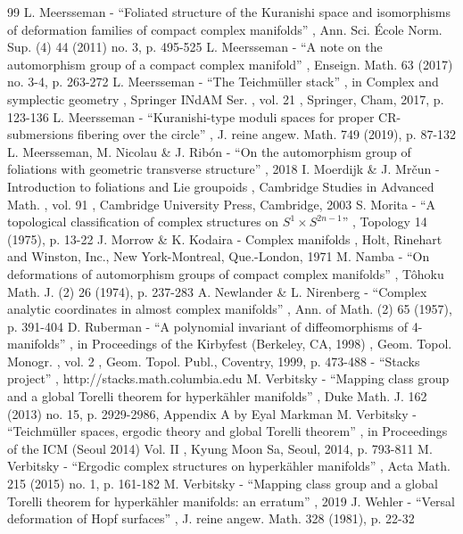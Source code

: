 \begin{thebibliography}{99}
 L. Meersseman - “Foliated structure of the Kuranishi space and isomorphisms of deformation families of compact complex manifolds” , Ann. Sci. École Norm. Sup. (4) 44 (2011) no. 3, p. 495-525
 L. Meersseman - “A note on the automorphism group of a compact complex manifold” , Enseign. Math. 63 (2017) no. 3-4, p. 263-272
 L. Meersseman - “The Teichmüller stack” , in Complex and symplectic geometry , Springer INdAM Ser. , vol. 21 , Springer, Cham, 2017, p. 123-136
 L. Meersseman - “Kuranishi-type moduli spaces for proper CR-submersions fibering over the circle” , J. reine angew. Math. 749 (2019), p. 87-132
 L. Meersseman, M. Nicolau \& J. Ribón - “On the automorphism group of foliations with geometric transverse structure” , 2018
 I. Moerdijk \& J. Mrčun - Introduction to foliations and Lie groupoids , Cambridge Studies in Advanced Math. , vol. 91 , Cambridge University Press, Cambridge, 2003
 S. Morita - “A topological classification of complex structures on $S^{1}\times S^{2n-1}$” , Topology 14 (1975), p. 13-22
 J. Morrow \& K. Kodaira - Complex manifolds , Holt, Rinehart and Winston, Inc., New York-Montreal, Que.-London, 1971
 M. Namba - “On deformations of automorphism groups of compact complex manifolds” , Tôhoku Math. J. (2) 26 (1974), p. 237-283
 A. Newlander \& L. Nirenberg - “Complex analytic coordinates in almost complex manifolds” , Ann. of Math. (2) 65 (1957), p. 391-404
 D. Ruberman - “A polynomial invariant of diffeomorphisms of 4-manifolds” , in Proceedings of the Kirbyfest (Berkeley, CA, 1998) , Geom. Topol. Monogr. , vol. 2 , Geom. Topol. Publ., Coventry, 1999, p. 473-488
 - “Stacks project” , http://stacks.math.columbia.edu
 M. Verbitsky - “Mapping class group and a global Torelli theorem for hyperkähler manifolds” , Duke Math. J. 162 (2013) no. 15, p. 2929-2986, Appendix A by Eyal Markman
 M. Verbitsky - “Teichmüller spaces, ergodic theory and global Torelli theorem” , in Proceedings of the ICM (Seoul 2014) Vol. II , Kyung Moon Sa, Seoul, 2014, p. 793-811
 M. Verbitsky - “Ergodic complex structures on hyperkähler manifolds” , Acta Math. 215 (2015) no. 1, p. 161-182
 M. Verbitsky - “Mapping class group and a global Torelli theorem for hyperkähler manifolds: an erratum” , 2019
 J. Wehler - “Versal deformation of Hopf surfaces” , J. reine angew. Math. 328 (1981), p. 22-32
\end{thebibliography}
